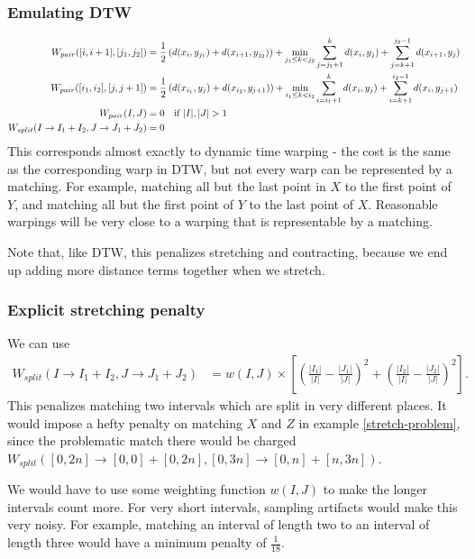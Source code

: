 \documentclass{article}
\begin{document}
\subsubsection{Emulating DTW}
\begin{align*}
W_{pair}([i,i+1], [j_1,j_2]) &= \frac{1}{2}\left(d(x_i,y_{j_1}) +
d(x_{i+1}, y_{j_2})\right) + \min_{j_1 \le k < j_2} \sum_{j=j_1 + 1}^k
d(x_i, y_j) + \sum_{j=k+1}^{j_2 - 1} d(x_{i+1}, y_j)\\
W_{pair}([i_1,i_2], [j,j+1]) &= \frac{1}{2}\left(d(x_{i_1},y_j) +
d(x_{i_2}, y_{j+1})\right) + \min_{i_1 \le k < i_2} \sum_{i=i_1 + 1}^k
d(x_i, y_j) + \sum_{i=k+1}^{i_2 - 1} d(x_{i}, y_{j+1})\\
W_{pair}(I, J) &= 0 \mbox{\quad if } |I|,|J| > 1 \\
W_{split}(I\to I_1 + I_2, J\to J_1 + J_2) &= 0
\end{align*}
This corresponds almost exactly to dynamic time warping - the cost is
the same as the corresponding warp in DTW, but not every warp can be
represented by a matching. For example, matching all but the last
point in $X$ to the first point of $Y$, and matching all but the first
point of $Y$ to the last point of $X$. Reasonable warpings will be
very close to a warping that is representable by a matching.

Note that, like DTW, this penalizes stretching and contracting, because we end up
adding more distance terms together when we stretch.

\subsubsection{Explicit stretching penalty}
We can use
\begin{align*}
W_{split}(I\to I_1 + I_2, J\to J_1 + J_2) &= w(I,J) \times \left[\left( \frac{|I_1|}{|I|} - \frac{|J_1|}{|J|}\right)^2 +
\left( \frac{|I_2|}{|I|} - \frac{|J_2|}{|J|}\right)^2 \right].
\end{align*}
This penalizes matching two intervals which are split in very
different places. It would impose a hefty penalty on matching $X$ and
$Z$ in example \ref{stretch-problem}, since the problematic match
there would be charged $W_{split}([0,2n]\to [0,0] + [0,2n], [0,3n] \to
[0,n] + [n,3n])$.

We would have to use some weighting function $w(I,J)$ to make the
longer intervals count more. For very short intervals, sampling
artifacts would make this very noisy. For example, matching an
interval of length two to an interval of length three would have a
minimum penalty of $\frac{1}{18}$.
\end{document}
